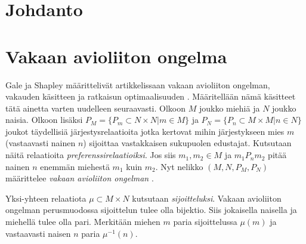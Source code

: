 \documentclass[gradu, twoside]{tktltiki}
\begin{document}
\title{}
\author{Jani Rahkola}
\date{\today}
\numberofpagesinformation{}



\maketitle

\doublespacing

\subject{Tietojenkäsittelytiede}

\begin{abstract}
\end{abstract}

\mytableofcontents

\section{Johdanto}

\section{Vakaan avioliiton ongelma}

Gale ja Shapley määrittelivät artikkelissaan vakaan avioliiton
ongelman, vakauden käsitteen ja ratkaisun optimaalisuuden
\cite{galeshapley62}. Määritellään nämä käsitteet tätä ainetta varten
uudelleen seuraavasti. Olkoon $M$ joukko miehiä ja $N$ joukko naisia.
Olkoon lisäksi $P_M = \{P_m \subset N \times N | m \in M\}$ ja $P_N =
\{P_n \subset M \times M | n \in N\}$ joukot täydellisiä
järjestysrelaatioita jotka kertovat mihin järjestykseen mies $m$
(vastaavasti nainen $n$) sijoittaa vastakkaisen sukupuolen edustajat.
Kutsutaan näitä relaatioita \emph{preferenssirelaatioiksi}. Jos siis
$m_1,m_2 \in M$ ja $m_1P_nm_2$ pitää nainen $n$ enemmän miehestä $m_1$
kuin $m_2$. Nyt nelikko $(M, N, P_M, P_N)$ määrittelee \emph{vakaan
  avioliiton ongelman }.

Yksi-yhteen relaatiota $\mu \subset M \times N$ kutsutaan
\emph{sijoitteluksi}. Vakaan avioliiton ongelman perusmuodossa
sijoittelun tulee olla bijektio. Siis jokaisella naisella ja miehellä
tulee olla pari. Merkitään miehen $m$ paria sijoittelussa $\mu(m)$ ja
vastaavasti naisen $n$ paria $\mu^{-1}(n)$.
\end{document}
